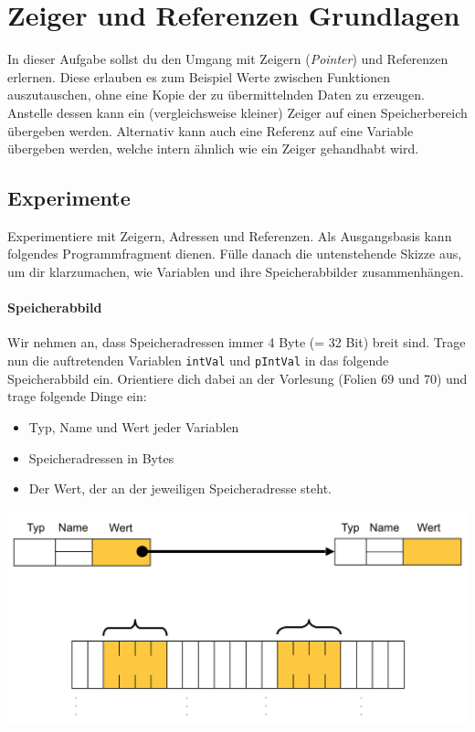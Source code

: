 \section{\ExercisePrefixMemory Zeiger und Referenzen Grundlagen}
In dieser Aufgabe sollst du den Umgang mit Zeigern (\emph{Pointer}) und Referenzen erlernen.
Diese erlauben es zum Beispiel Werte zwischen Funktionen auszutauschen, ohne eine Kopie der zu übermittelnden Daten zu erzeugen.
Anstelle dessen kann ein (vergleichsweise kleiner) Zeiger auf einen Speicherbereich übergeben werden.
Alternativ kann auch eine Referenz auf eine Variable übergeben werden, welche intern ähnlich wie ein Zeiger gehandhabt wird.

\subsection{Experimente}
Experimentiere mit Zeigern, Adressen und Referenzen. Als Ausgangsbasis kann folgendes Programmfragment dienen.
Fülle danach die untenstehende Skizze aus, um dir klarzumachen, wie Variablen und ihre Speicherabbilder zusammenhängen.



\paragraph{Speicherabbild}
Wir nehmen an, dass Speicheradressen immer 4 Byte (= 32 Bit) breit sind. 
Trage nun die auftretenden Variablen \lstinline{intVal} und \lstinline{pIntVal} in das folgende Speicherabbild ein. Orientiere dich dabei an der Vorlesung (Folien 69 und 70) und trage folgende Dinge ein:
\begin{itemize}
	\item Typ, Name und Wert jeder Variablen
	\item Speicheradressen in Bytes
	\item Der Wert, der an der jeweiligen Speicheradresse steht.
\end{itemize}

\begin{center}
\includegraphics[width=.9\textwidth]{02_memory/figures/memory_image.png}
\end{center}


